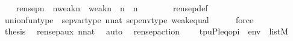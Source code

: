 \begin{isabellebody}
\ \ \isamarkupfalse%
\ {\isachardoublequoteopen}rensep{\isacharparenleft}{\kern0pt}n{\isacharparenright}{\kern0pt}\ {\isasymin}\ {\isacharparenleft}{\kern0pt}{}{\isacharhash}{\kern0pt}{\isacharplus}{\kern0pt}n{\isacharminus}{\kern0pt}weak{\isacharparenleft}{\kern0pt}n{\isacharcomma}{\kern0pt}{}{\isacharparenright}{\kern0pt}{\isacharparenright}{\kern0pt}\ {\isasymunion}\ weak{\isacharparenleft}{\kern0pt}n{\isacharcomma}{\kern0pt}{}{\isacharparenright}{\kern0pt}\ {\isasymrightarrow}\ {}{\isacharhash}{\kern0pt}{\isacharplus}{\kern0pt}n\ {\isasymunion}\ {\isacharparenleft}{\kern0pt}{}{\isacharhash}{\kern0pt}{\isacharplus}{\kern0pt}n\ {\isacharminus}{\kern0pt}\ {}{\isacharparenright}{\kern0pt}{\isachardoublequoteclose}\isanewline
\ \ \ \ \isamarkupfalse%
\ rensep{\isacharunderscore}{\kern0pt}def\ \isanewline
\ \ \ \ \isamarkupfalse%
\ union{\isacharunderscore}{\kern0pt}fun{\isacharunderscore}{\kern0pt}type\ \ sep{\isacharunderscore}{\kern0pt}var{\isacharunderscore}{\kern0pt}type\ {\isacartoucheopen}n{\isasymin}nat{\isacartoucheclose}\ sep{\isacharunderscore}{\kern0pt}env{\isacharunderscore}{\kern0pt}type\ weak{\isacharunderscore}{\kern0pt}equal\isanewline
\ \ \ \ \isamarkupfalse%
\ force\isanewline
\ \ \isamarkupfalse%
\isanewline
\ \ \isamarkupfalse%
\ {\isacharquery}{\kern0pt}thesis\ \isamarkupfalse%
\ rensep{\isacharunderscore}{\kern0pt}aux\ {\isacartoucheopen}n{\isasymin}nat{\isacartoucheclose}\ \isamarkupfalse%
\ auto\ \isanewline
{}\isamarkupfalse%
%
\endisatagproof
{\isafoldproof}%
%
\isadelimproof
\isanewline
%
\endisadelimproof
\isanewline
{}\isamarkupfalse%
\ rensep{\isacharunderscore}{\kern0pt}action\ {\isacharcolon}{\kern0pt}\isanewline
\ \ \ {\isachardoublequoteopen}{\isacharbrackleft}{\kern0pt}t{\isacharcomma}{\kern0pt}p{\isacharcomma}{\kern0pt}u{\isacharcomma}{\kern0pt}P{\isacharcomma}{\kern0pt}leq{\isacharcomma}{\kern0pt}o{\isacharcomma}{\kern0pt}pi{\isacharbrackright}{\kern0pt}\ {\isacharat}{\kern0pt}\ env\ {\isasymin}\ list{\isacharparenleft}{\kern0pt}M{\isacharparenright}{\kern0pt}{\isachardoublequoteclose}\isanewline

\end{isabellebody}
